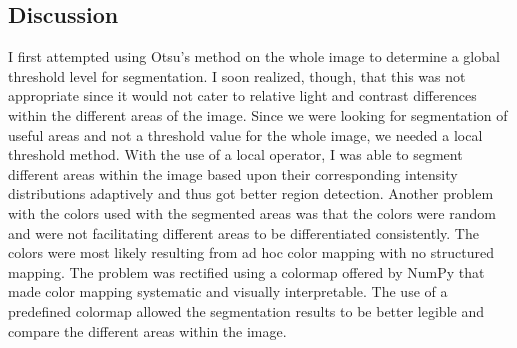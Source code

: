 \subsection{Discussion}
I first attempted using Otsu's method on the whole image to determine a global threshold level for segmentation. I soon realized, though, that this was not appropriate since it would not cater to relative light and contrast differences within the different areas of the image. Since we were looking for segmentation of useful areas and not a threshold value for the whole image, we needed a local threshold method. With the use of a local operator, I was able to segment different areas within the image based upon their corresponding intensity distributions adaptively and thus got better region detection. Another problem with the colors used with the segmented areas was that the colors were random and were not facilitating different areas to be differentiated consistently. The colors were most likely resulting from ad hoc color mapping with no structured mapping. The problem was rectified using a colormap offered by NumPy that made color mapping systematic and visually interpretable. The use of a predefined colormap allowed the segmentation results to be better legible and compare the different areas within the image.